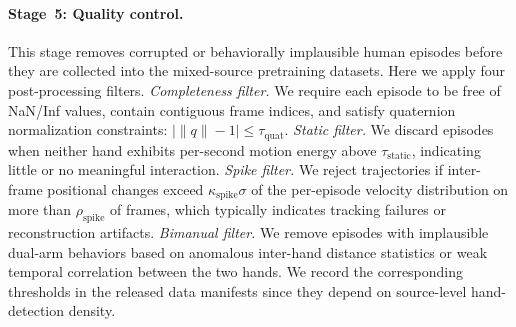 \paragraph{Stage~5: Quality control.}
This stage removes corrupted or behaviorally implausible human episodes before they are collected into the mixed-source pretraining datasets. Here we apply four post-processing filters. 
\emph{Completeness filter.} We require each
episode to be free of NaN/Inf values, contain contiguous frame indices, and satisfy quaternion normalization constraints: $|\|q\|-1| \le \tau_{\mathrm{quat}}$. \emph{Static filter.} We discard episodes when neither hand exhibits per-second motion energy above $\tau_{\mathrm{static}}$, indicating little or no meaningful interaction. 
\emph{Spike filter.} We reject trajectories if inter-frame positional changes exceed $\kappa_{\mathrm{spike}}\sigma$ of the per-episode velocity distribution on more than $\rho_{\mathrm{spike}}$ of frames, which typically indicates tracking failures or reconstruction artifacts.
\emph{Bimanual filter.} We remove episodes with implausible dual-arm behaviors based on anomalous inter-hand distance statistics or weak temporal correlation between the two hands. We record the corresponding thresholds in the released data manifests since they depend on source-level hand-detection density.

